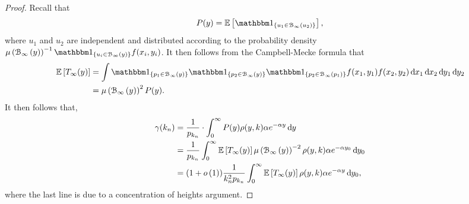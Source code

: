 \begin{proof}
Recall that 
\[
	P(y) = \Exp{\ind{u_1 \in \BallPo{u_2}}},
\]
where $u_1$ and $u_2$ are independent and distributed according to the probability density \\$\Mu{\BallPo{y}}^{-1} \ind{u_i \in \BallPo{y}} f(x_i, y_i)$. It then follows from the Campbell-Mecke formula that
\begin{align*}
	\Exp{T_\infty(y)} &= \int \ind{p_1 \in \BallPo{y}}\ind{p_2 \in \BallPo{y}}
		\ind{p_2 \in \BallPo{p_1}} f(x_1,y_1) f(x_2,y_2) \dd x_1 \dd x_2 \dd y_1 \dd y_2\\
	&= \Mu{\BallPo{y}}^2 P(y).
\end{align*}
It then follows that,
\begin{align*}
	\gamma(k_n) &= \frac{1}{p_{k_n}} \cdot \int_0^\infty P(y) \rho(y,k) \alpha e^{-\alpha y} \operatorname{\mathrm{d}\hspace{-2pt}} y \\
	&= \frac{1}{p_{k_n}} \int_0^\infty \mathbb{E}\left[T_\infty(y)\right] \mu\left({\mathcal B}_{\infty}\left(y\right)\right)^{-2} \rho(y,k) 
		\alpha e^{-\alpha y_0} \operatorname{\mathrm{d}\hspace{-2pt}} y_0\\
	&= (1+ o\left(1\right)) \frac{1}{k_n^2 p_{k_n}} \int_0^\infty \mathbb{E}\left[T_\infty(y)\right] \rho(y,k) \alpha e^{-\alpha y} \operatorname{\mathrm{d}\hspace{-2pt}} y_0,
\end{align*}
where the last line is due to a concentration of heights argument.


\end{proof}
